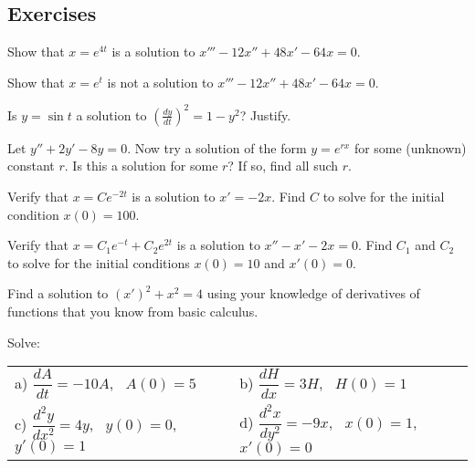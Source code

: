 \subsection{Exercises}

\begin{exercise}
Show that $x = e^{4t}$ is a solution to $x'''-12 x'' + 48 x' - 64 x = 0$.
\end{exercise}

\begin{exercise}
Show that $x = e^{t}$ is not a solution to $x'''-12 x'' + 48 x' - 64 x = 0$.
\end{exercise}

\begin{exercise}
Is $y = \sin t$ a solution to ${\left( \frac{dy}{dt} \right)}^2 = 1 - y^2$?
Justify.
\end{exercise}

\begin{exercise}
Let $y'' + 2y' - 8y = 0$.  Now try a solution of the form $y = e^{rx}$ for
some (unknown) constant $r$.  Is this a solution
for some $r$?  If so, find all such $r$.
\end{exercise}

\begin{exercise}
Verify that $x = C e^{-2t}$ is a solution to $x' = -2x$.
Find $C$ to solve for the initial condition $x(0) = 100$.
\end{exercise}

\begin{exercise}
Verify that $x = C_1 e^{-t} + C_2 e^{2t}$ is a solution to $x'' - x' -2 x =
0$.  Find $C_1$ and $C_2$ to solve for the initial conditions $x(0) = 10$
and $x'(0) = 0$.
\end{exercise}

\begin{exercise}
Find a solution to
${(x')}^2 + x^2 = 4$
using your knowledge of derivatives of functions that you
know from basic calculus.
\end{exercise}

\begin{exercise}
Solve:
\medskip

\noindent
\begin{tabular}{llll}
a) $\dfrac{dA}{dt} = -10 A$,~ $A(0)=5$ & &
b) $\dfrac{dH}{dx} = 3 H$,~ $H(0)=1$ \\[12pt]
c) $\dfrac{d^2y}{dx^2} = 4 y$,~ $y(0)=0$,~ $y'(0)=1$ &&
d) $\dfrac{d^2x}{dy^2} = -9 x$,~ $x(0)=1$,~ $x'(0)=0$
\end{tabular}
\end{exercise}

